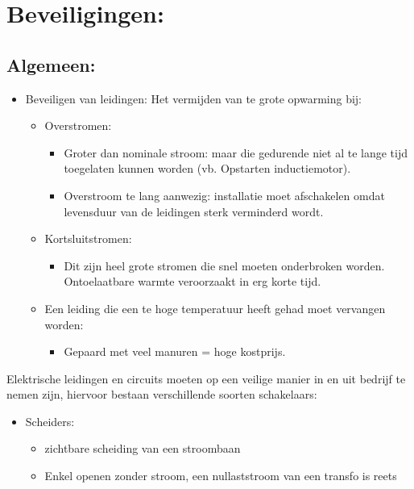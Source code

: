 \documentclass[12pt]{article}
\begin{document}
\section{Beveiligingen:}
\subsection{Algemeen:}
\begin{itemize}
    \item[] Beveiligen van leidingen: Het vermijden van te grote opwarming bij:\begin{itemize}
        \item Overstromen:\begin{itemize}
            \item Groter dan nominale stroom: maar die gedurende niet al te lange tijd toegelaten kunnen worden (vb. Opstarten inductiemotor).
            \item Overstroom te lang aanwezig: installatie moet afschakelen omdat levensduur van de leidingen sterk verminderd wordt.
        \end{itemize}
        \item Kortsluitstromen:\begin{itemize}
            \item Dit zijn heel grote stromen die snel moeten onderbroken worden. Ontoelaatbare warmte veroorzaakt in erg korte tijd.
        \end{itemize}
        \item Een leiding die een te hoge temperatuur heeft gehad moet vervangen worden:\begin{itemize}
            \item Gepaard met veel manuren = hoge kostprijs.
        \end{itemize}
    \end{itemize}
\end{itemize}
Elektrische leidingen en circuits moeten op een veilige manier in en uit bedrijf te nemen zijn, hiervoor bestaan verschillende soorten schakelaars:\begin{itemize}
    \item Scheiders:\begin{itemize}
        \item zichtbare scheiding van een stroombaan 
        \item Enkel openen zonder stroom, een nullaststroom van een transfo is reets 
    \end{itemize}
\end{itemize}
\end{document}
